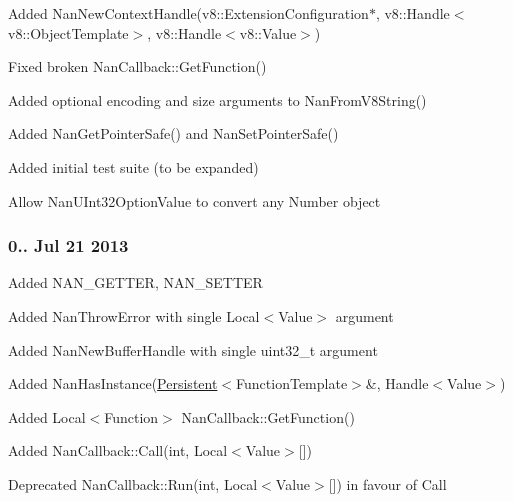 \begin{DoxyItemize}
\item Added Nan\+New\+Context\+Handle(v8\+::\+Extension\+Configuration$\ast$, v8\+::\+Handle$<$v8\+::\+Object\+Template$>$, v8\+::\+Handle$<$v8\+::\+Value$>$)
\item Fixed broken Nan\+Callback\+::\+Get\+Function()
\item Added optional encoding and size arguments to Nan\+From\+V8\+String()
\item Added Nan\+Get\+Pointer\+Safe() and Nan\+Set\+Pointer\+Safe()
\item Added initial test suite (to be expanded)
\item Allow Nan\+U\+Int32\+Option\+Value to convert any Number object
\end{DoxyItemize}

\subsubsection*{0.. Jul 21 2013}


\begin{DoxyItemize}
\item Added {\ttfamily N\+A\+N\+\_\+\+G\+E\+T\+T\+ER}, {\ttfamily N\+A\+N\+\_\+\+S\+E\+T\+T\+ER}
\item Added {\ttfamily Nan\+Throw\+Error} with single Local$<$\+Value$>$ argument
\item Added {\ttfamily Nan\+New\+Buffer\+Handle} with single uint32\+\_\+t argument
\item Added {\ttfamily Nan\+Has\+Instance(\hyperlink{class_persistent}{Persistent}$<$Function\+Template$>$\&, Handle$<$Value$>$)}
\item Added {\ttfamily Local$<$Function$>$ Nan\+Callback\+::\+Get\+Function()}
\item Added {\ttfamily Nan\+Callback\+::\+Call(int, Local$<$Value$>$\mbox{[}\mbox{]})}
\item Deprecated {\ttfamily Nan\+Callback\+::\+Run(int, Local$<$Value$>$\mbox{[}\mbox{]})} in favour of Call 
\end{DoxyItemize}